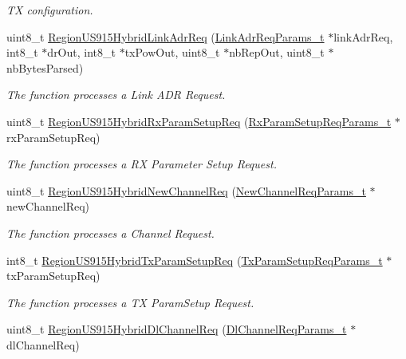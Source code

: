 \begin{DoxyCompactItemize}
\begin{DoxyCompactList}\small\item\em TX configuration. \end{DoxyCompactList}\item 
uint8\+\_\+t \hyperlink{group__REGIONUS915HYB_gade4dc50b11235e0a6675b0d22240dea2}{Region\+U\+S915\+Hybrid\+Link\+Adr\+Req} (\hyperlink{group__REGION_gad4af503e8d4de1846129e26a799a1e8e}{Link\+Adr\+Req\+Params\+\_\+t} $\ast$link\+Adr\+Req, int8\+\_\+t $\ast$dr\+Out, int8\+\_\+t $\ast$tx\+Pow\+Out, uint8\+\_\+t $\ast$nb\+Rep\+Out, uint8\+\_\+t $\ast$nb\+Bytes\+Parsed)
\begin{DoxyCompactList}\small\item\em The function processes a Link A\+DR Request. \end{DoxyCompactList}\item 
uint8\+\_\+t \hyperlink{group__REGIONUS915HYB_gaaee00f3fbfae1f41b0eec05d8b564177}{Region\+U\+S915\+Hybrid\+Rx\+Param\+Setup\+Req} (\hyperlink{group__REGION_ga7165f282c670c728c36d534df2285157}{Rx\+Param\+Setup\+Req\+Params\+\_\+t} $\ast$rx\+Param\+Setup\+Req)
\begin{DoxyCompactList}\small\item\em The function processes a RX Parameter Setup Request. \end{DoxyCompactList}\item 
uint8\+\_\+t \hyperlink{group__REGIONUS915HYB_ga8555b0827350263310c34afbb060842e}{Region\+U\+S915\+Hybrid\+New\+Channel\+Req} (\hyperlink{group__REGION_gae2abcdb6dbb843c9faf5fd3009eca9d6}{New\+Channel\+Req\+Params\+\_\+t} $\ast$new\+Channel\+Req)
\begin{DoxyCompactList}\small\item\em The function processes a Channel Request. \end{DoxyCompactList}\item 
int8\+\_\+t \hyperlink{group__REGIONUS915HYB_gaea3f732a576b39e66791fb8e319b39a9}{Region\+U\+S915\+Hybrid\+Tx\+Param\+Setup\+Req} (\hyperlink{group__REGION_ga26836ef2996e70410e42ef471073f855}{Tx\+Param\+Setup\+Req\+Params\+\_\+t} $\ast$tx\+Param\+Setup\+Req)
\begin{DoxyCompactList}\small\item\em The function processes a TX Param\+Setup Request. \end{DoxyCompactList}\item 
uint8\+\_\+t \hyperlink{group__REGIONUS915HYB_ga0656307062a414233d72e9cf68e5763c}{Region\+U\+S915\+Hybrid\+Dl\+Channel\+Req} (\hyperlink{group__REGION_gae0d608ff1f8ea0a430e4f9a4c38ec7f3}{Dl\+Channel\+Req\+Params\+\_\+t} $\ast$dl\+Channel\+Req)

\end{DoxyCompactItemize}
